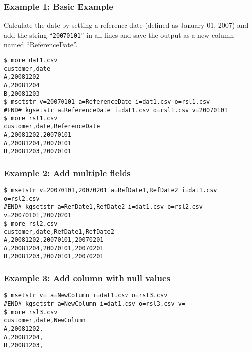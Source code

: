 \subsubsection*{Example 1: Basic Example}

Calculate the date by setting a reference date  (defined as January 01, 2007)  and add the string “\verb|20070101|” in all lines and save the output as a new column named “ReferenceDate”.


\begin{Verbatim}[baselinestretch=0.7,frame=single]
$ more dat1.csv
customer,date
A,20081202
A,20081204
B,20081203
$ msetstr v=20070101 a=ReferenceDate i=dat1.csv o=rsl1.csv
#END# kgsetstr a=ReferenceDate i=dat1.csv o=rsl1.csv v=20070101
$ more rsl1.csv
customer,date,ReferenceDate
A,20081202,20070101
A,20081204,20070101
B,20081203,20070101
\end{Verbatim}
\subsubsection*{Example 2: Add multiple fields}



\begin{Verbatim}[baselinestretch=0.7,frame=single]
$ msetstr v=20070101,20070201 a=RefDate1,RefDate2 i=dat1.csv o=rsl2.csv
#END# kgsetstr a=RefDate1,RefDate2 i=dat1.csv o=rsl2.csv v=20070101,20070201
$ more rsl2.csv
customer,date,RefDate1,RefDate2
A,20081202,20070101,20070201
A,20081204,20070101,20070201
B,20081203,20070101,20070201
\end{Verbatim}
\subsubsection*{Example 3: Add column with null values}



\begin{Verbatim}[baselinestretch=0.7,frame=single]
$ msetstr v= a=NewColumn i=dat1.csv o=rsl3.csv
#END# kgsetstr a=NewColumn i=dat1.csv o=rsl3.csv v=
$ more rsl3.csv
customer,date,NewColumn
A,20081202,
A,20081204,
B,20081203,
\end{Verbatim}
